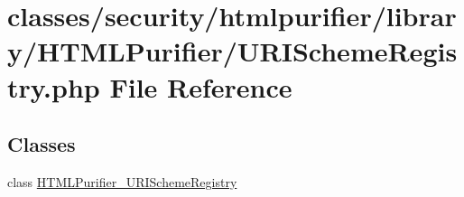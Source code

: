 \hypertarget{URISchemeRegistry_8php}{\section{classes/security/htmlpurifier/library/\+H\+T\+M\+L\+Purifier/\+U\+R\+I\+Scheme\+Registry.php File Reference}
\label{URISchemeRegistry_8php}
}
\subsection*{Classes}
\begin{DoxyCompactItemize}
\item 
class \hyperlink{classHTMLPurifier__URISchemeRegistry}{H\+T\+M\+L\+Purifier\+\_\+\+U\+R\+I\+Scheme\+Registry}
\end{DoxyCompactItemize}

